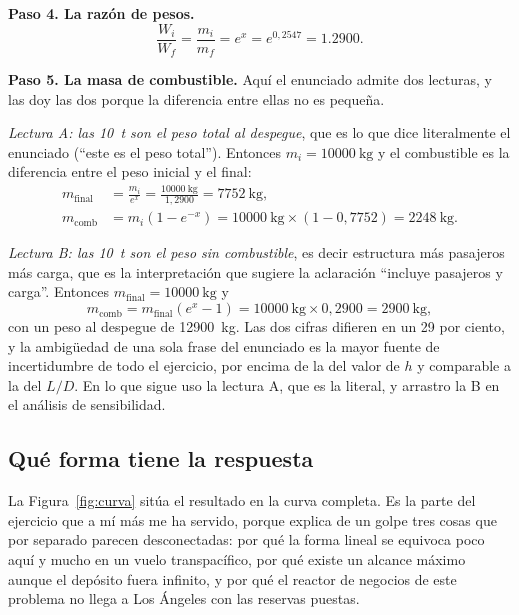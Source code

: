 \documentclass[11pt,letterpaper]{article}
\begin{document}
\textbf{Paso 4. La razón de pesos.}
\begin{equation}
\frac{W_i}{W_f} = \frac{m_i}{m_f} = e^{x} = e^{0{,}2547} = \num{1.2900}.
\end{equation}

\textbf{Paso 5. La masa de combustible.} Aquí el enunciado admite dos lecturas,
y las doy las dos porque la diferencia entre ellas no es pequeña.

\emph{Lectura A: las \SI{10}{\tonne} son el peso total al despegue}, que es lo
que dice literalmente el enunciado (\enquote{este es el peso total}). Entonces
\(m_i = \SI{10000}{\kilogram}\) y el combustible es la diferencia entre el peso
inicial y el final:
\begin{align}
m_{\text{final}} &= \frac{m_i}{e^{x}}
  = \frac{\SI{10000}{\kilogram}}{1{,}2900} = \SI{7752}{\kilogram},\\
m_{\text{comb}}  &= m_i\left(1-e^{-x}\right)
  = \SI{10000}{\kilogram}\times(1-0{,}7752)
  = \boxed{\SI{2248}{\kilogram}} .
\label{eq:resultado}
\end{align}

\emph{Lectura B: las \SI{10}{\tonne} son el peso sin combustible}, es decir
estructura más pasajeros más carga, que es la interpretación que sugiere la
aclaración \enquote{incluye pasajeros y carga}. Entonces
\(m_{\text{final}} = \SI{10000}{\kilogram}\) y
\begin{equation}
m_{\text{comb}} = m_{\text{final}}\left(e^{x}-1\right)
  = \SI{10000}{\kilogram}\times 0{,}2900 = \SI{2900}{\kilogram},
\end{equation}
con un peso al despegue de \SI{12900}{\kilogram}. Las dos cifras difieren en un
29 por ciento, y la ambigüedad de una sola frase del enunciado es la mayor
fuente de incertidumbre de todo el ejercicio, por encima de la del valor de
\(h\) y comparable a la del \(L/D\). En lo que sigue uso la lectura A, que es
la literal, y arrastro la B en el análisis de sensibilidad.

\subsection{Qué forma tiene la respuesta}

La Figura~\ref{fig:curva} sitúa el resultado en la curva completa. Es la parte
del ejercicio que a mí más me ha servido, porque explica de un golpe tres cosas
que por separado parecen desconectadas: por qué la forma lineal se equivoca
poco aquí y mucho en un vuelo transpacífico, por qué existe un alcance máximo
aunque el depósito fuera infinito, y por qué el reactor de negocios de este
problema no llega a Los Ángeles con las reservas puestas.
\end{document}
